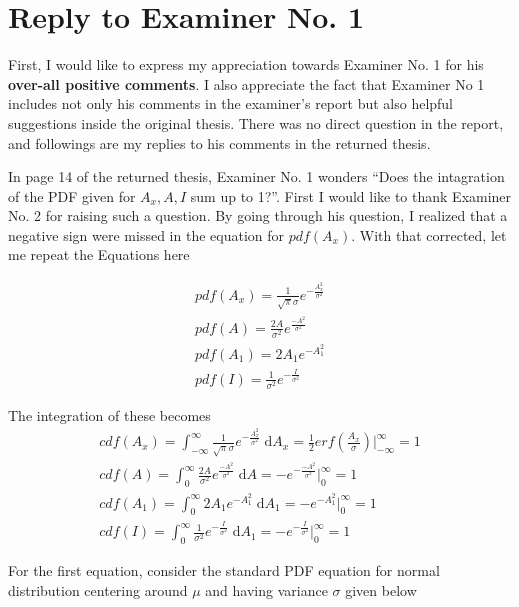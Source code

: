 \section*{Reply to Examiner No. 1}

\begin{replyheader}
\end{replyheader}  

First, I would like to express my appreciation towards Examiner No. 1 for his \textbf{over-all positive comments}.
I also appreciate the fact that Examiner No 1 includes
  not only his comments in the examiner's report
  but also helpful suggestions inside the original thesis.
There was no direct question in the report, and followings are my replies to his comments in the returned thesis.

In page 14 of the returned thesis, Examiner No. 1 wonders ``Does the intagration of the PDF given for $A_x, A, I$ sum up to 1?''.
First I would like to thank Examiner No. 2 for raising such a question.
By going through his question, I realized that a negative sign were missed in the equation for $pdf(A_x)$.
With that corrected, let me repeat the Equations here

\begin{align}
pdf(A_x) = \frac{1}{\sqrt{\pi} \sigma} e^{- \frac{A_x^2}{\sigma^2}} \\
pdf(A) = \frac{2A}{\sigma^2} e^{\frac{-A^2}{\sigma^2}} \\
pdf(A_1) = 2A_1 e^{-A_1^2} \\
pdf(I) = \frac{1}{\sigma^2} e^{-\frac{I}{\sigma^2}}
\end{align}

The integration of these becomes
\begin{align}
cdf(A_x) = \int_{-\infty}^{\infty} \frac{1}{\sqrt{\pi} \sigma} e^{- \frac{A_x^2}{\sigma^2}}  \; \mathrm{d}A_x = \frac{1}{2} erf \left( \frac{A_x}{\sigma} \right)  \Big|_{-\infty}^{\infty} = 1 \\
cdf(A) = \int_0^{\infty} \frac{2A}{\sigma^2} e^{\frac{-A^2}{\sigma^2}}  \; \mathrm{d}A = -e^{-\frac{-A^2}{\sigma^2}} \Big|_0^{\infty} = 1\\
cdf(A_1) = \int_0^{\infty} 2A_1 e^{-A_1^2} \; \mathrm{d}A_1 = -e^{-A_1^2} \Big|_0^{\infty} = 1\\
cdf(I) = \int_0^{\infty} \frac{1}{\sigma^2} e^{-\frac{I}{\sigma^2}} \; \mathrm{d}A_1 = -e^{-\frac{I}{\sigma^2}}  \Big|_0^{\infty} = 1
\end{align}


For the first equation, consider the standard PDF equation for normal distribution centering around $\mu$ and having variance $\sigma$ given below

